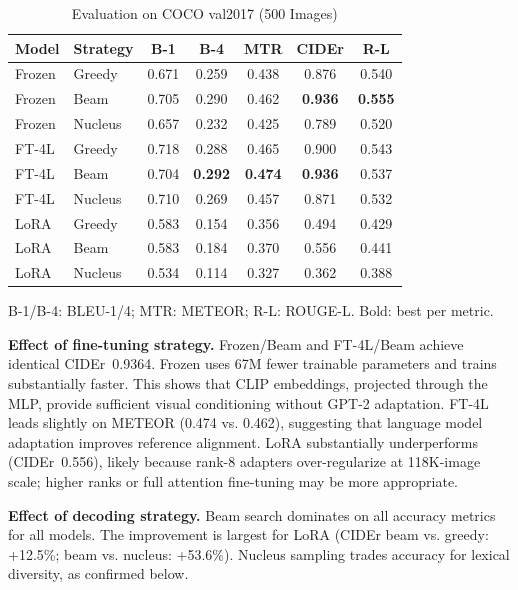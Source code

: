 \documentclass[conference]{IEEEtran}
\begin{document}
\begin{table}[t]
\caption{Evaluation on COCO val2017 (500 Images)}
\label{tab:main_results}
\centering
\setlength{\tabcolsep}{4pt}
\begin{tabular}{llccccc}
\toprule
\textbf{Model} & \textbf{Strategy} & \textbf{B-1} & \textbf{B-4} & \textbf{MTR} & \textbf{CIDEr} & \textbf{R-L} \\
\midrule
Frozen & Greedy  & 0.671 & 0.259 & 0.438 & 0.876 & 0.540 \\
Frozen & Beam    & 0.705 & 0.290 & 0.462 & \textbf{0.936} & \textbf{0.555} \\
Frozen & Nucleus & 0.657 & 0.232 & 0.425 & 0.789 & 0.520 \\
\midrule
FT-4L  & Greedy  & 0.718 & 0.288 & 0.465 & 0.900 & 0.543 \\
FT-4L  & Beam    & 0.704 & \textbf{0.292} & \textbf{0.474} & \textbf{0.936} & 0.537 \\
FT-4L  & Nucleus & 0.710 & 0.269 & 0.457 & 0.871 & 0.532 \\
\midrule
LoRA   & Greedy  & 0.583 & 0.154 & 0.356 & 0.494 & 0.429 \\
LoRA   & Beam    & 0.583 & 0.184 & 0.370 & 0.556 & 0.441 \\
LoRA   & Nucleus & 0.534 & 0.114 & 0.327 & 0.362 & 0.388 \\
\bottomrule
\end{tabular}
\vspace{2pt}
{\small B-1/B-4: BLEU-1/4; MTR: METEOR; R-L: ROUGE-L. Bold: best per metric.}
\end{table}

\textbf{Effect of fine-tuning strategy.} Frozen/Beam and FT-4L/Beam achieve identical CIDEr~0.9364. Frozen uses 67M fewer trainable parameters and trains substantially faster. This shows that CLIP embeddings, projected through the MLP, provide sufficient visual conditioning without GPT-2 adaptation. FT-4L leads slightly on METEOR (0.474 vs. 0.462), suggesting that language model adaptation improves reference alignment. LoRA substantially underperforms (CIDEr~0.556), likely because rank-8 adapters over-regularize at 118K-image scale; higher ranks or full attention fine-tuning may be more appropriate.

\textbf{Effect of decoding strategy.} Beam search dominates on all accuracy metrics for all models. The improvement is largest for LoRA (CIDEr beam vs. greedy: +12.5\%; beam vs. nucleus: +53.6\%). Nucleus sampling trades accuracy for lexical diversity, as confirmed below.
\end{document}

